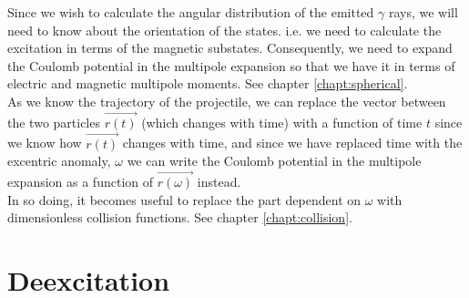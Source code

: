 Since we wish to calculate the angular distribution of the emitted $\gamma$
rays, we will need to know about the orientation of the states. i.e. we need
to calculate the excitation in terms of the magnetic substates.
Consequently, we need to expand the Coulomb potential in the multipole
expansion so that we have it in terms of electric and magnetic multipole
moments. See chapter \ref{chapt:spherical}.\\

As we know the trajectory of the projectile, we can replace the vector
between the two particles $\vec{r(t)}$ (which changes with time) with a
function of time $t$ since we know how $\vec{r(t)}$ changes with time, and
since we have replaced time with the excentric anomaly, $\omega$ we can
write the Coulomb potential in the multipole expansion as a function of
$\vec{r(\omega)}$ instead.\\

In so doing, it becomes useful to replace the part dependent on $\omega$
with dimensionless collision functions. See chapter \ref{chapt:collision}.

\section{Deexcitation}
